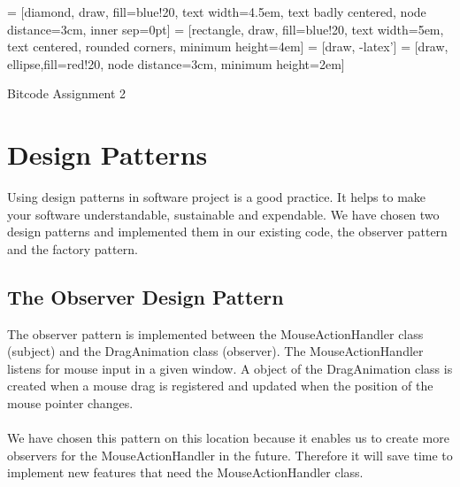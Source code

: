 \documentclass{article}
\begin{document}
 = [diamond, draw, fill=blue!20, 
    text width=4.5em, text badly centered, node distance=3cm, inner sep=0pt]
 = [rectangle, draw, fill=blue!20, 
    text width=5em, text centered, rounded corners, minimum height=4em]
 = [draw, -latex']
 = [draw, ellipse,fill=red!20, node distance=3cm,
    minimum height=2em]


\begin{titlepage}
	\Huge{Bitcode Assignment 2}
\end{titlepage}


\section{Design Patterns}
Using design patterns in software project is a good practice. It helps to make your software understandable, sustainable and expendable. We have chosen two design patterns and implemented them in our existing code, the observer pattern and the factory pattern.

\subsection{The Observer Design Pattern}
The observer pattern is implemented between the MouseActionHandler class (subject) and the DragAnimation class (observer). The MouseActionHandler listens for mouse input in a given window. A object of the DragAnimation class is created when a mouse drag is registered and updated when the position of the mouse pointer changes. 
\paragraph{} We have chosen this pattern on this location because it enables us to create more observers for the MouseActionHandler in the future. Therefore it will save time to implement new features that need the MouseActionHandler class.
 
\end{document}
